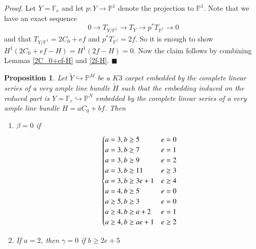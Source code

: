 \documentclass[11pt,twoside]{amsart}
\theoremstyle{plain}
\numberwithin{equation}{section}
\newtheorem{proposition}[theorem]{Proposition}
\theoremstyle{definition}
\newcommand*{\QEDA}{\hfill\ensuremath{\blacksquare}}
\begin{document}
\noindent\textit{Proof.} Let $Y = \mathbb{F}_e$ and let $p: Y \to \mathbb{P}^1$ denote the projection to $\mathbb{P}^1$. Note that we have an exact sequence 
$$0 \to T_{Y/\mathbb{P}^1} \to T_Y \to p^*T_{\mathbb{P}^1} \to 0$$
and that $T_{Y/\mathbb{P}^1} = 2C_0+ef$ and $p^*T_{\mathbb{P}^1} = 2f$. So it is enough to show $H^1(2C_0+ef-H) = H^1(2f-H) = 0$. Now the claim follows by combining Lemmas \ref{2C_0+ef-H} and \ref{2f-H}. \QEDA



\begin{proposition}\label{calculating beta}
Let $\widetilde{Y} \hookrightarrow \mathbb{P}^M$ be a $K3$ carpet embedded by the complete linear series of a very ample line bundle $\widetilde{H}$ such that the embedding induced on the reduced part is $Y = \mathbb{F}_e \hookrightarrow \mathbb{P}^N$ embedded by the complete linear series of a very ample line bundle $H = aC_0+bf$.   
Then 

\begin{enumerate}
    \item $\beta = 0$ if
    \[
\begin{cases}
    a = 3, b \geq 5 & e = 0  \\
    a = 3, b \geq 7 & e = 1  \\
    a = 3, b \geq 9 & e = 2  \\
\color{black}
    a = 3, b \geq 11 & e \geq 3 \\
    a = 3, b \geq 3e+1 & e \geq 4 \\
\color{black}
    a = 4, b \geq 5 & e = 0 \\
    a \geq 5, b \geq 3 & e = 0 \\
    a \geq 4, b \geq a+2 & e = 1 \\
    a \geq 4, b \geq ae+1 & e \geq 2 \\
    
\end{cases}
  \]

  \item If $a = 2$, then $\gamma = 0$ if $b \geq 2e+5$



\end{enumerate}
  

 


\end{proposition}
 
\end{document}
